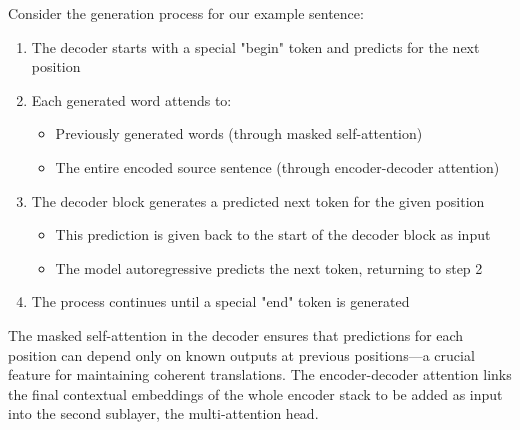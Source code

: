 Consider the generation process for our example sentence: \\
\begin{enumerate}
    \item The decoder starts with a special "begin" token and predicts for the next position
    \item Each generated word attends to:
    \begin{itemize}
        \item Previously generated words (through masked self-attention)
        \item The entire encoded source sentence (through encoder-decoder attention)
    \end{itemize}
        \item The decoder block generates a predicted next token for the given position
    \begin{itemize}
        \item This prediction is given back to the start of the decoder block as input
        \item The model autoregressive predicts the next token, returning to step 2 
    \end{itemize}
    \item The process continues until a special "end" token is generated
\end{enumerate}

The masked self-attention in the decoder ensures that predictions for each position can depend only on known outputs at previous positions—a crucial feature for maintaining coherent translations. The encoder-decoder attention links the final contextual embeddings of the whole encoder stack to be added as input into the second sublayer, the multi-attention head. 

